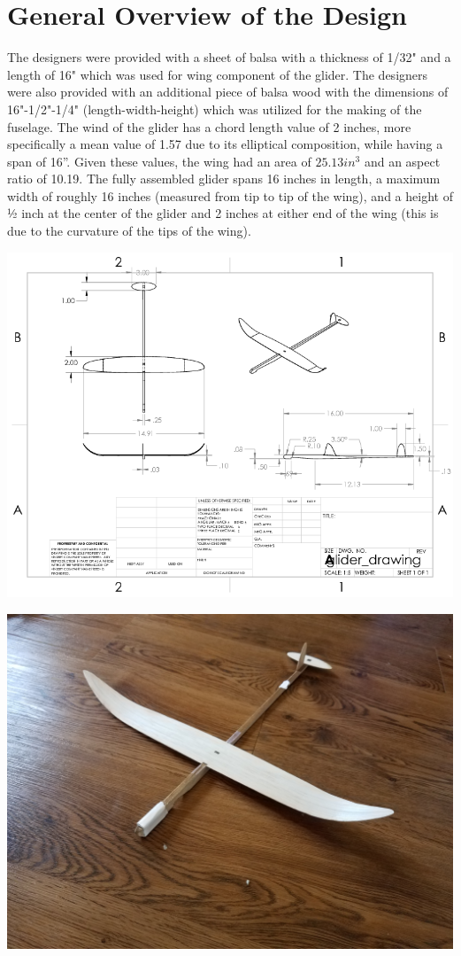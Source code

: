 \documentclass{article}
\begin{document}
\section{General Overview of the Design}
The designers were provided with a sheet of balsa with a thickness of 1/32" and a length of 16" which was used for wing component of the glider. The designers were also provided with an additional piece of balsa wood with the dimensions of 16"-1/2"-1/4" (length-width-height) which was utilized for the making of the fuselage. The wind of the glider has a chord length value of 2 inches, more specifically a mean value of 1.57 due to its elliptical composition, while having a span of 16”. Given these values, the wing had an area of $25.13 in^3$ and an aspect ratio of 10.19. The fully assembled glider spans 16 inches in length, a maximum width of roughly 16 inches (measured from tip to tip of the wing), and a height of ½ inch at the center of the glider and 2 inches at either end of the wing (this is due to the curvature of the tips of the wing).

\includegraphics[width = \linewidth]{glider_drawing.png}

\includegraphics[width = \textwidth]{glider.jpg}
\end{document}
